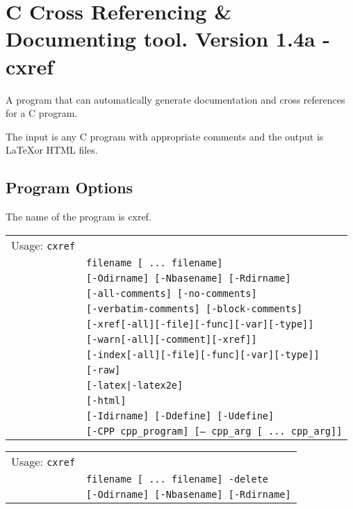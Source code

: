 
\pagestyle{myheadings}





\chapter{C Cross Referencing \& Documenting tool. Version 1.4a - cxref}

A program that can automatically generate documentation and cross references for
a C program.

The input is any C program with appropriate comments and the output is \LaTeX or
HTML files.

\section{Program Options}

The name of the program is cxref.

\smallskip

\begin{tabular}{ll}
Usage: {\tt cxref} & \\
& {\tt filename [ ... filename]} \\
& {\tt [-Odirname] [-Nbasename] [-Rdirname]} \\
& {\tt [-all-comments] [-no-comments]} \\
& {\tt [-verbatim-comments] [-block-comments]} \\
& {\tt [-xref[-all][-file][-func][-var][-type]]} \\
& {\tt [-warn[-all][-comment][-xref]]} \\
& {\tt [-index[-all][-file][-func][-var][-type]]} \\
& {\tt [-raw]} \\
& {\tt [-latex|-latex2e]} \\
& {\tt [-html]} \\
& {\tt [-Idirname] [-Ddefine] [-Udefine]} \\
& {\tt [-CPP cpp\_program] [-- cpp\_arg [ ... cpp\_arg]]} \\
\end{tabular}
\begin{tabular}{ll}
Usage: {\tt cxref} & \\
& {\tt filename [ ... filename] -delete} \\
& {\tt [-Odirname] [-Nbasename] [-Rdirname]} \\
\end{tabular}

